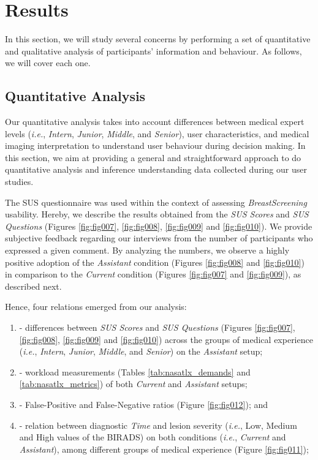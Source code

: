 \section{Results}
\label{sec:results}

In this section, we will study several concerns by performing a set of quantitative and qualitative analysis of participants' information and behaviour.
As follows, we will cover each one.

\subsection{Quantitative Analysis}
\label{sec:quantitative}

Our quantitative analysis takes into account differences between medical expert levels ({\em i.e.}, {\it Intern}, {\it Junior}, {\it Middle}, and {\it Senior}), user characteristics, and medical imaging interpretation to understand user behaviour during decision making.
In this section, we aim at providing a general and straightforward approach to do quantitative analysis  and inference understanding data collected during our user studies.

The SUS questionnaire was used within the context of assessing {\it BreastScreening} usability.
Hereby, we describe the results obtained from the {\it SUS Scores} and {\it SUS Questions} (Figures \ref{fig:fig007}, \ref{fig:fig008}, \ref{fig:fig009} and \ref{fig:fig010}).
We provide subjective feedback regarding our interviews from the number of participants who expressed a given comment.
By analyzing the numbers, we observe a highly positive adoption of the {\it Assistant} condition (Figures \ref{fig:fig008} and \ref{fig:fig010}) in comparison to the {\it Current} condition (Figures \ref{fig:fig007} and \ref{fig:fig009}), as described next.

\hfill

\noindent
Hence, four relations emerged from our analysis:

\begin{enumerate}[label=\alph*]
\item - differences between {\it SUS Scores} and {\it SUS Questions} (Figures \ref{fig:fig007}, \ref{fig:fig008}, \ref{fig:fig009} and \ref{fig:fig010}) across the groups of medical experience ({\em i.e.}, {\it Intern}, {\it Junior}, {\it Middle}, and {\it Senior}) on the {\it Assistant} setup;
\item - workload measurements (Tables \ref{tab:nasatlx_demands} and \ref{tab:nasatlx_metrics}) of both {\it Current} and {\it Assistant} setups;
\item - False-Positive and False-Negative ratios (Figure \ref{fig:fig012}); and
\item - relation between diagnostic {\it Time} and lesion severity ({\it i.e.}, Low, Medium and High values of the BIRADS) on both conditions ({\it i.e.}, {\it Current} and {\it Assistant}), among different groups of medical experience (Figure \ref{fig:fig011});
\end{enumerate}

